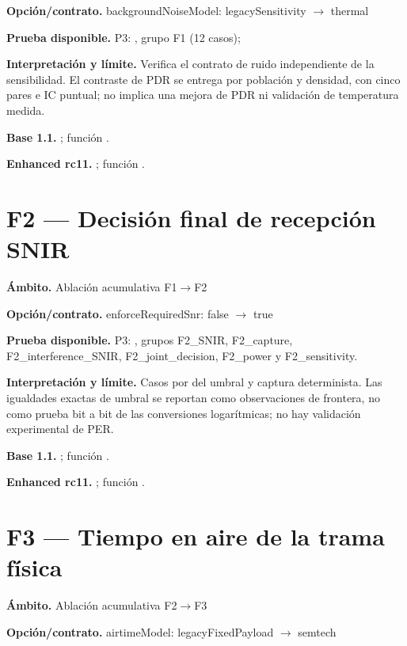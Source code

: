 \documentclass[10pt,a4paper]{article}
\begin{document}
\textbf{Opción/contrato.} backgroundNoiseModel: legacySensitivity $\to$ thermal

\textbf{Prueba disponible.} P3: , grupo F1 (12 casos); 

\textbf{Interpretación y límite.} Verifica el contrato de ruido independiente de la sensibilidad. El contraste de PDR se entrega por población y densidad, con cinco pares e IC puntual; no implica una mejora de PDR ni validación de temperatura medida.

\textbf{Base 1.1.} ; función .\par
\textbf{Enhanced rc11.} ; función .\par
\section*{F2 — Decisión final de recepción SNIR}
\textbf{Ámbito.} Ablación acumulativa F1$\to$F2

\textbf{Opción/contrato.} enforceRequiredSnr: false $\to$ true

\textbf{Prueba disponible.} P3: , grupos F2\_SNIR, F2\_capture, F2\_interference\_SNIR, F2\_joint\_decision, F2\_power y F2\_sensitivity.

\textbf{Interpretación y límite.} Casos por  del umbral y captura determinista. Las igualdades exactas de umbral se reportan como observaciones de frontera, no como prueba bit a bit de las conversiones logarítmicas; no hay validación experimental de PER.

\textbf{Base 1.1.} ; función .\par
\textbf{Enhanced rc11.} ; función .\par
\section*{F3 — Tiempo en aire de la trama física}
\textbf{Ámbito.} Ablación acumulativa F2$\to$F3

\textbf{Opción/contrato.} airtimeModel: legacyFixedPayload $\to$ semtech
\end{document}

